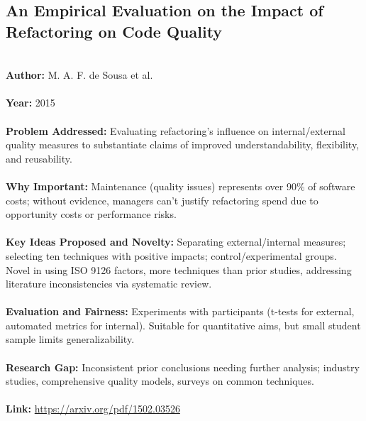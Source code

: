 \documentclass[12pt]{article}
\begin{document}
\subsection*{An Empirical Evaluation on the Impact of Refactoring on Code Quality}
\\
\textbf{Author:} M. A. F. de Sousa et al. \\
\\
\textbf{Year:} 2015 \\
\\
\textbf{Problem Addressed:} Evaluating refactoring’s influence on internal/external quality measures to substantiate claims of improved understandability, flexibility, and reusability. \\
\\
\textbf{Why Important:} Maintenance (quality issues) represents over 90\% of software costs; without evidence, managers can’t justify refactoring spend due to opportunity costs or performance risks. \\
\\
\textbf{Key Ideas Proposed and Novelty:} Separating external/internal measures; selecting ten techniques with positive impacts; control/experimental groups. Novel in using ISO 9126 factors, more techniques than prior studies, addressing literature inconsistencies via systematic review. \\
\\
\textbf{Evaluation and Fairness:} Experiments with participants (t-tests for external, automated metrics for internal). Suitable for quantitative aims, but small student sample limits generalizability. \\
\\
\textbf{Research Gap:} Inconsistent prior conclusions needing further analysis; industry studies, comprehensive quality models, surveys on common techniques. \\
\\
\textbf{Link:} \url{https://arxiv.org/pdf/1502.03526}
\pagebreak

\end{document}
